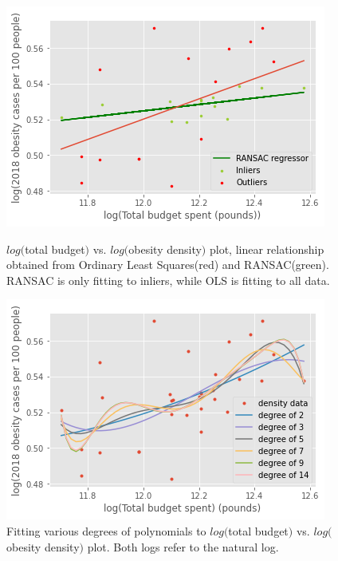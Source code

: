 \documentclass[12pt]{article}
\begin{document}
\begin{figure}[!htb]
   \begin{minipage}{0.48\textwidth}
     \centering
     \includegraphics[width=.95\linewidth]{RANSAC.png}
     \captionsetup{font=scriptsize}
     \caption{$log($total budget$)$ vs. $log($obesity density$)$ plot, linear relationship obtained from Ordinary Least Squares(red) and RANSAC(green). RANSAC is only fitting to inliers, while OLS is fitting to all data.}\label{RANSAC}
   \end{minipage}\hfill
   \begin{minipage}{0.48\textwidth}
     \centering
     \includegraphics[width=.95\linewidth]{poly.png}
     \captionsetup{font=scriptsize}
     \caption{Fitting various degrees of polynomials to $log($total budget$)$ vs. $log($obesity density$)$ plot. Both logs refer to the natural log.}\label{Poly}
   \end{minipage}
\end{figure}
\end{document}
